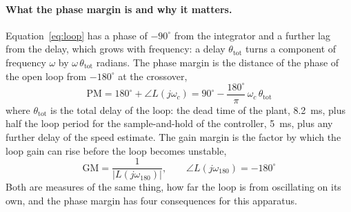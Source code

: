 \paragraph{What the phase margin is and why it matters.}
Equation~\ref{eq:loop} has a phase of $-90^{\circ}$ from the integrator and a further lag from the delay, which grows with frequency: a delay $\theta_{\mathrm{tot}}$ turns a component of frequency $\omega$ by $\omega\,\theta_{\mathrm{tot}}$ radians. The phase margin is the distance of the phase of the open loop from $-180^{\circ}$ at the crossover,
\begin{equation}
    \mathrm{PM} = 180^{\circ} + \angle L(j\omega_c) = 90^{\circ} - \frac{180^{\circ}}{\pi}\,\omega_c\,\theta_{\mathrm{tot}}
    \label{eq:pm}
\end{equation}
where $\theta_{\mathrm{tot}}$ is the total delay of the loop: the dead time of the plant, 8.2~ms, plus half the loop period for the sample-and-hold of the controller, 5~ms, plus any further delay of the speed estimate. The gain margin is the factor by which the loop gain can rise before the loop becomes unstable,
\begin{equation}
    \mathrm{GM} = \frac{1}{|L(j\omega_{180})|}, \qquad \angle L(j\omega_{180}) = -180^{\circ}
    \label{eq:gm}
\end{equation}
Both are measures of the same thing, how far the loop is from oscillating on its own, and the phase margin has four consequences for this apparatus.
